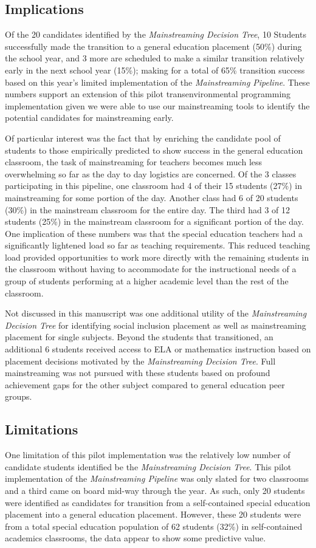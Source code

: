 \documentclass[twoside]{article}
\begin{document}
\subsection{Implications}
Of the 20 candidates identified by the \textit{Mainstreaming Decision Tree}, 10 Students successfully made the transition to a general education placement (50\%) during the school year, and 3 more are scheduled to make a similar transition relatively early in the next school year (15\%); making for a total of 65\% transition success based on this year's limited implementation of the \textit{Mainstreaming Pipeline}. These numbers support an extension of this pilot transenvironmental programming implementation given we were able to use our mainstreaming tools to identify the potential candidates for mainstreaming early.

Of particular interest was the fact that by enriching the candidate pool of students to those empirically predicted to show success in the general education classroom, the task of mainstreaming for teachers becomes much less overwhelming so far as the day to day logistics are concerned. Of the 3 classes participating in this pipeline, one classroom had 4 of their 15 students (27\%) in mainstreaming for some portion of the day. Another class had 6 of 20 students (30\%) in the mainstream classroom for the entire day. The third had 3 of 12 students (25\%) in the mainstream classroom for a significant portion of the day. One implication of these numbers was that the special education teachers had a significantly lightened load so far as teaching requirements. This reduced teaching load provided opportunities to work more directly with the remaining students in the classroom without having to accommodate for the instructional needs of a group of students performing at a higher academic level than the rest of the classroom.

Not discussed in this manuscript was one additional utility of the \textit{Mainstreaming Decision Tree} for identifying social inclusion placement as well as mainstreaming placement for single subjects. Beyond the students that transitioned, an additional 6 students received access to ELA or mathematics instruction based on placement decisions motivated by the \textit{Mainstreaming Decision Tree}. Full mainstreaming was not pursued with these students based on profound achievement gaps for the other subject compared to general education peer groups. 

\subsection{Limitations}
One limitation of this pilot implementation was the relatively low number of candidate students identified be the \textit{Mainstreaming Decision Tree}. This pilot implementation of the \textit{Mainstreaming Pipeline} was only slated for two classrooms and a third came on board mid-way through the year. As such, only 20 students were identified as candidates for transition from a self-contained special education placement into a general education placement. However, these 20 students were from a total special education population of 62 students (32\%) in self-contained academics classrooms, the data appear to show some predictive value.
\end{document}
